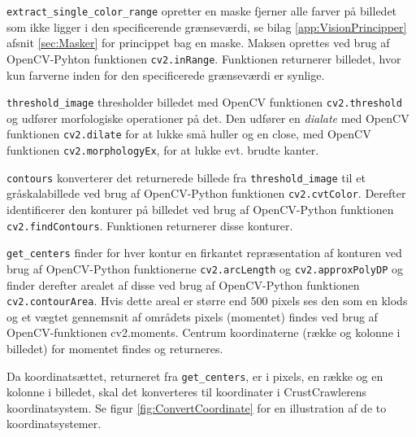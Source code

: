 \texttt{extract\_single\_color\_range} opretter en maske fjerner alle farver på billedet som ikke ligger i den specificerende grænseværdi, se bilag \ref{app:VisionPrincipper} afsnit \vref{sec:Masker} for princippet bag en maske.
Maksen oprettes ved brug af OpenCV-Pyhton funktionen \texttt{cv2.inRange}.
Funktionen returnerer billedet, hvor kun farverne inden for den specificerede grænseværdi er synlige.

\texttt{threshold\_image} thresholder billedet med OpenCV funktionen \texttt{cv2.threshold} og udfører morfologiske operationer på det.
Den udfører en \textit{dialate} med OpenCV funktionen \texttt{cv2.dilate} for at lukke små huller og en close, med OpenCV funktionen \texttt{cv2.morphologyEx}, for at lukke evt. brudte kanter.

\texttt{contours} konverterer det returnerede billede fra \texttt{threshold\_image} til et gråskalabillede ved brug af OpenCV-Python funktionen \texttt{cv2.cvtColor}.
Derefter identificerer den konturer på billedet ved brug af OpenCV-Python funktionen \texttt{cv2.findContours}.
Funktionen returnerer disse konturer.

\texttt{get\_centers} finder for hver kontur en firkantet repræsentation af konturen ved brug af OpenCV-Python funktionerne \texttt{cv2.arcLength} og \texttt{cv2.approxPolyDP} og finder derefter arealet af disse ved brug af OpenCV-Python funktionen \texttt{cv2.contourArea}.
Hvis dette areal er større end 500 pixels ses den som en klods og et vægtet gennemsnit af områdets pixels (momentet) findes ved brug af OpenCV-funktionen cv2.moments.
Centrum koordinaterne (række og kolonne i billedet) for momentet findes og returneres. 

Da koordinatsættet, returneret fra \texttt{get\_centers}, er i pixels, en række og en kolonne i billedet, skal det konverteres til koordinater i CrustCrawlerens koordinatsystem.
Se figur \vref{fig:ConvertCoordinate} for en illustration af de to koordinatsystemer.


